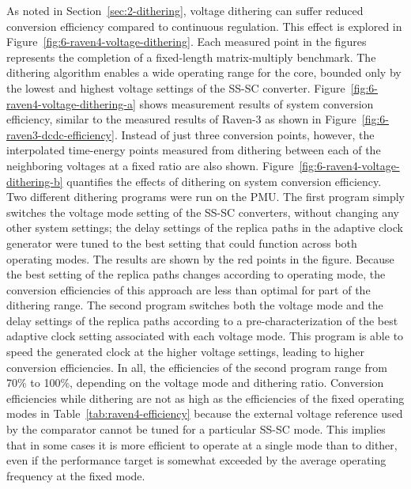 \documentclass[graybox]{svmult}
\begin{document}
As noted in Section~\ref{sec:2-dithering}, voltage dithering can suffer reduced conversion efficiency compared to continuous regulation.
This effect is explored in Figure~\ref{fig:6-raven4-voltage-dithering}.
Each measured point in the figures represents the completion of a fixed-length matrix-multiply benchmark.
The dithering algorithm enables a wide operating range for the core, bounded only by the lowest and highest voltage settings of the SS-SC converter. 
Figure~\ref{fig:6-raven4-voltage-dithering-a} shows measurement results of system conversion efficiency, similar to the measured results of Raven-3 as shown in Figure~\ref{fig:6-raven3-dcdc-efficiency}.
Instead of just three conversion points, however, the interpolated time-energy points measured from dithering between each of the neighboring voltages at a fixed ratio are also shown.
Figure~\ref{fig:6-raven4-voltage-dithering-b} quantifies the effects of dithering on system conversion efficiency.
Two different dithering programs were run on the PMU.
The first program simply switches the voltage mode setting of the SS-SC converters, without changing any other system settings; the delay settings of the replica paths in the adaptive clock generator were tuned to the best setting that could function across both operating modes.
The results are shown by the red points in the figure.
Because the best setting of the replica paths changes according to operating mode, the conversion efficiencies of this approach are less than optimal for part of the dithering range.
The second program switches both the voltage mode and the delay settings of the replica paths according to a pre-characterization of the best adaptive clock setting associated with each voltage mode.
This program is able to speed the generated clock at the higher voltage settings, leading to higher conversion efficiencies.
In all, the efficiencies of the second program range from 70\% to 100\%, depending on the voltage mode and dithering ratio.
Conversion efficiencies while dithering are not as high as the efficiencies of the fixed operating modes in Table~\ref{tab:raven4-efficiency} because the external voltage reference used by the comparator cannot be tuned for a particular SS-SC mode.
This implies that in some cases it is more efficient to operate at a single mode than to dither, even if the performance target is somewhat exceeded by the average operating frequency at the fixed mode.
\end{document}
